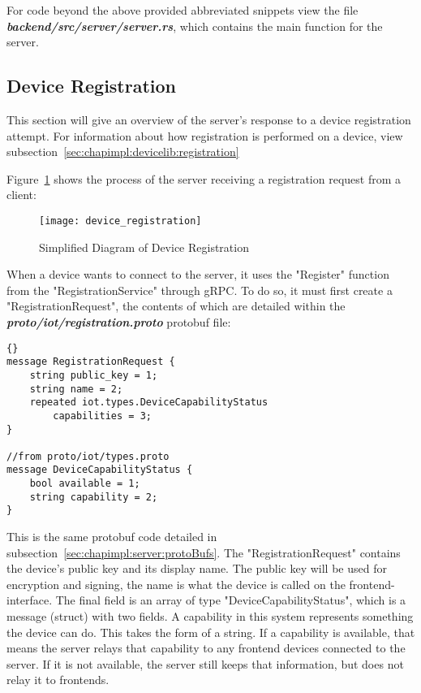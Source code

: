 For code beyond the above provided abbreviated snippets view the file \textbf{\textit{backend/src/server/server.rs}}, which contains the main function for the server.

\subsection{Device Registration} \label{sec:chapimpl:server:registration} 
This section will give an overview of the server's response to a device registration attempt. For information about how registration is performed on a device, view subsection~\ref{sec:chapimpl:devicelib:registration}

Figure~\ref{fig:server_registration} shows the process of the server receiving a registration request from a client:
\begin{figure}[h]
\caption{Simplified Diagram of Device Registration}
\texttt{[image: device\_registration]}
\label{fig:server_registration}
\end{figure}

When a device wants to connect to the server, it uses the "Register" function from the "RegistrationService" through gRPC. To do so, it must first create a "RegistrationRequest", the contents of which are detailed within the \textit{\textbf{proto/iot/registration.proto}} protobuf file:

\begin{lstlisting}[language=protobuf3, style=boxed, showstringspaces=false]{}
message RegistrationRequest {
    string public_key = 1;
    string name = 2;
    repeated iot.types.DeviceCapabilityStatus 
        capabilities = 3;
}

//from proto/iot/types.proto
message DeviceCapabilityStatus {
    bool available = 1;
    string capability = 2;
}
\end{lstlisting}
This is the same protobuf code detailed in subsection~\ref{sec:chapimpl:server:protoBufs}. The "RegistrationRequest" contains the device's public key and its display name. The public key will be used for encryption and signing, the name is what the device is called on the frontend-interface. The final field is an array of type "DeviceCapabilityStatus", which is a message (struct) with two fields. A capability in this system represents something the device can do. This takes the form of a string. If a capability is available, that means the server relays that capability to any frontend devices connected to the server. If it is not available, the server still keeps that information, but does not relay it to frontends. 

